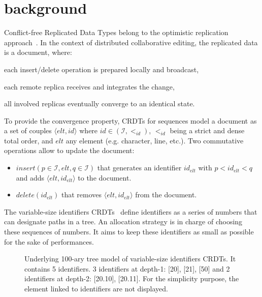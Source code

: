 
\section{background}
\label{sec:background}

Conflict-free Replicated Data Types belong to the optimistic
replication approach~\cite{saito2002replication,saito2005optimistic}. In the
context of distributed collaborative editing, the replicated data is a
document, where:
\begin{inparaenum}[(1)]
\item each insert/delete operation is prepared locally and broadcast,
\item each remote replica receives and integrates the change,
\item all involved replicas eventually converge to an identical state.
\end{inparaenum}

To provide the convergence property, CRDTs for sequences model a document as a
set of couples $\langle elt, id\rangle$ where $id \in (\mathcal{I}, <_{id})$,
$<_{id}$ being a strict and dense total order, and $elt$ any element
(e.g. character, line, etc.). Two commutative operations allow to update the
document:
\begin{itemize}
\item $insert(p \in \mathcal{I}, elt, q \in \mathcal{I})$ that generates an
  identifier $id_{elt}$ with $p<id_{elt}<q$ and adds $\langle elt, id_{elt}
  \rangle$ to the document.
\item $delete(id_{elt})$ that removes $\langle elt, id_{elt}\rangle$ from the
  document.
\end{itemize} 

The variable-size identifiers
CRDTs~\cite{preguica2009commutative,weiss2009logoot} define identifiers as a
series of numbers that can designate paths in a tree. An allocation strategy is
in charge of choosing these sequences of numbers. It aims to keep these
identifiers as small as possible for the sake of performances.

\begin{figure}[h]
\begin{center}

\end{center}
\caption{Underlying 100-ary tree model of variable-size identifiers CRDTs. It
  contains 5 identifiers. 3 identifiers at depth-1: [20], [21], [50] and 2
  identifiers at depth-2: [20.10], [20.11]. For the simplicity purpose, the
  element linked to identifiers are not displayed.}
\label{fig:treeexample}
\end{figure}

